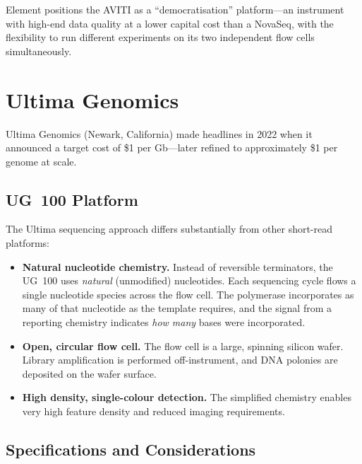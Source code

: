 \begin{keyconcept}[title={AVITI's Value Proposition}]
Element positions the AVITI as a ``democratisation'' platform---an instrument with high-end data quality at a lower capital cost than a NovaSeq, with the flexibility to run different experiments on its two independent flow cells simultaneously.
\end{keyconcept}


\section{Ultima Genomics}
\label{sec:ultima}

Ultima Genomics (Newark, California) made headlines in 2022 when it announced a target cost of \$1 per Gb---later refined to approximately \$1 per genome at scale.

\subsection{UG~100 Platform}

The Ultima sequencing approach differs substantially from other short-read platforms:

\begin{itemize}[nosep]
  \item \textbf{Natural nucleotide chemistry.} Instead of reversible terminators, the UG~100 uses \emph{natural} (unmodified) nucleotides. Each sequencing cycle flows a single nucleotide species across the flow cell. The polymerase incorporates as many of that nucleotide as the template requires, and the signal from a reporting chemistry indicates \emph{how many} bases were incorporated.

  \item \textbf{Open, circular flow cell.} The flow cell is a large, spinning silicon wafer. Library amplification is performed off-instrument, and DNA polonies are deposited on the wafer surface.

  \item \textbf{High density, single-colour detection.} The simplified chemistry enables very high feature density and reduced imaging requirements.
\end{itemize}

\subsection{Specifications and Considerations}

